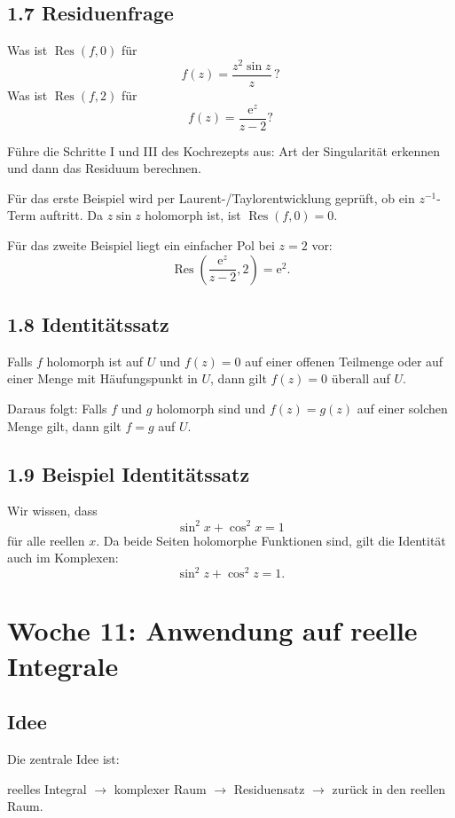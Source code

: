 \documentclass[11pt,a4paper]{article}
\newcommand{\ee}{\mathrm e}
\newcommand{\Res}{\operatorname{Res}}
\begin{document}
\subsection{1.7 Residuenfrage}
\begin{fragebox}
Was ist $\Res(f,0)$ für
\[
f(z)=\frac{z^2\sin z}{z}\,?
\]
Was ist $\Res(f,2)$ für
\[
f(z)=\frac{\ee^z}{z-2}?
\]
\end{fragebox}
\begin{tippbox}
Führe die Schritte I und III des Kochrezepts aus: Art der Singularität erkennen und dann das Residuum berechnen.
\end{tippbox}
\begin{antwortbox}
Für das erste Beispiel wird per Laurent-/Taylorentwicklung geprüft, ob ein $z^{-1}$-Term auftritt. Da $z\sin z$ holomorph ist, ist $\Res(f,0)=0$.

Für das zweite Beispiel liegt ein einfacher Pol bei $z=2$ vor:
\[
\Res\left(\frac{\ee^z}{z-2},2\right)=\ee^2.
\]
\end{antwortbox}

\subsection{1.8 Identitätssatz}
\begin{importantbox}
Falls $f$ holomorph ist auf $U$ und $f(z)=0$ auf einer offenen Teilmenge oder auf einer Menge mit Häufungspunkt in $U$, dann gilt $f(z)=0$ überall auf $U$.
\end{importantbox}
Daraus folgt: Falls $f$ und $g$ holomorph sind und $f(z)=g(z)$ auf einer solchen Menge gilt, dann gilt $f=g$ auf $U$.

\subsection{1.9 Beispiel Identitätssatz}
Wir wissen, dass
\[
\sin^2 x+\cos^2 x=1
\]
für alle reellen $x$. Da beide Seiten holomorphe Funktionen sind, gilt die Identität auch im Komplexen:
\[
\sin^2 z+\cos^2 z=1.
\]

\section{Woche 11: Anwendung auf reelle Integrale}

\subsection{Idee}
Die zentrale Idee ist:
\begin{center}
reelles Integral $\longrightarrow$ komplexer Raum $\longrightarrow$ Residuensatz $\longrightarrow$ zurück in den reellen Raum.
\end{center}
\end{document}
